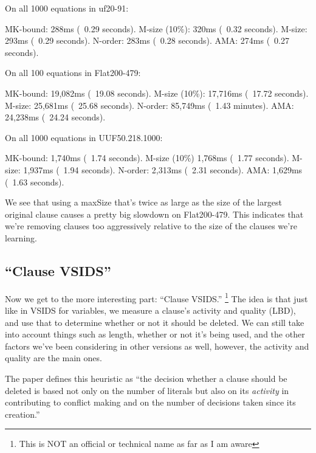 \begin{FVerbatim}
On all 1000 equations in uf20-91:

MK-bound:       288ms (~0.29 seconds).
M-size (10\%):  320ms (~0.32 seconds).
M-size:         293ms (~0.29 seconds).
N-order:        283ms (~0.28 seconds).
AMA:            274ms (~0.27 seconds).

On all 100 equations in Flat200-479:

MK-bound:       19,082ms (~19.08 seconds).
M-size (10\%):  17,716ms (~17.72 seconds).
M-size:         25,681ms (~25.68 seconds).
N-order:        85,749ms (~1.43 minutes).
AMA:            24,238ms (~24.24 seconds).

On all 1000 equations in UUF50.218.1000:

MK-bound:       1,740ms (~1.74 seconds).
M-size (10\%)   1,768ms (~1.77 seconds).
M-size:         1,937ms (~1.94 seconds).
N-order:        2,313ms (~2.31 seconds).
AMA:            1,629ms (~1.63 seconds).
\end{FVerbatim}
\noindent
We see that using a maxSize that's twice as large as the size of the largest original clause
causes a pretty big slowdown on Flat200-479. This indicates that we're removing clauses 
too aggressively relative to the size of the clauses we're learning.

\subsection{``Clause VSIDS''}

Now we get to the more interesting part: ``Clause VSIDS.''
\footnote{This is NOT an official or technical name as far as I am aware}
The idea is that just like in VSIDS for variables, we measure a clause's activity
and quality (LBD), and use that to determine whether or not it should be deleted. 
We can still take into account things such as length, whether or not it's being used, 
and the other factors we've been considering in other versions as well, however, the 
activity and quality are the main ones.

The paper defines this heuristic as ``the decision whether a clause should be 
deleted is based not only on the number of literals but also on its \textit{activity} in 
contributing to conflict making and on the number of decisions taken since its creation.''


